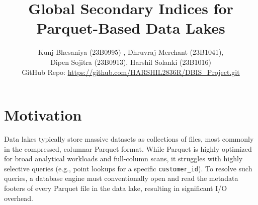 \documentclass[11pt, a4paper]{article}
\title{\textbf{Global Secondary Indices for \\ Parquet-Based Data Lakes}}
\author{ Kunj Bhesaniya (23B0995) , Dhruvraj Merchant (23B1041), \\ Dipen Sojitra (23B0913), Harshil Solanki (23B1016)\\GitHub Repo: \url{https://github.com/HARSHIL2836R/DBIS_Project.git}}
\date{}
\begin{document}
\maketitle

\section{Motivation}
Data lakes typically store massive datasets as collections of files, most commonly in the compressed, columnar Parquet format. While Parquet is highly optimized for broad analytical workloads and full-column scans, it struggles with highly selective queries (e.g., point lookups for a specific \texttt{customer\_id}). To resolve such queries, a database engine must conventionally open and read the metadata footers of every Parquet file in the data lake, resulting in significant I/O overhead.
\end{document}
